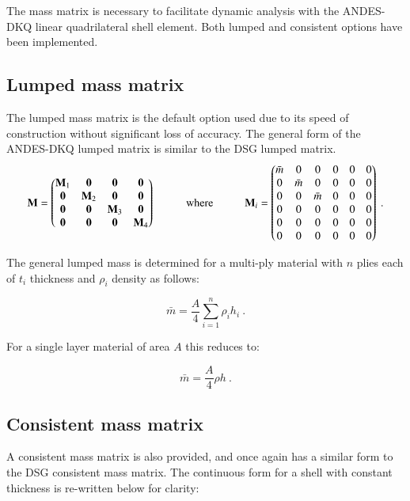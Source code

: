 The mass matrix is necessary to facilitate dynamic analysis with the ANDES-DKQ linear quadrilateral shell element. Both lumped and consistent options have been implemented.

\subsection{Lumped mass matrix}
The lumped mass matrix is the default option used due to its speed of construction without significant loss of accuracy. The general form of the ANDES-DKQ lumped matrix is similar to the DSG lumped matrix.
\begin{equation} 
\mathbf{M} =  
\begin{pmatrix}
\mathbf{M}_1 & \mathbf{0} & \mathbf{0} & \mathbf{0}\\
\mathbf{0} & \mathbf{M}_2 & \mathbf{0} & \mathbf{0}\\
\mathbf{0} & \mathbf{0} & \mathbf{M}_3 & \mathbf{0}\\
\mathbf{0} &\mathbf{0} & \mathbf{0} & \mathbf{M}_4
\end{pmatrix}
\hspace{10mm}
\text{where}
\hspace{10mm}
\mathbf{M}_i =  
\begin{pmatrix}
\bar{m} & 0 & 0 & 0 & 0 & 0\\
0 & \bar{m} & 0 & 0 & 0 & 0\\
0 & 0 & \bar{m} &0 & 0 & 0\\
0 & 0 & 0 & 0 & 0 & 0\\
0 & 0 & 0 & 0 & 0 & 0\\
0 & 0 & 0 & 0 & 0 & 0
\end{pmatrix}
\label{eqqmass1}\ .
\end{equation}

The general lumped mass is determined for a multi-ply material with $n$ plies each of $t_i$ thickness and $\rho_i$ density as follows:

\begin{equation} 
\bar{m} = \frac{A}{4} \sum_{i=1}^n \rho_i h_i
\label{eqqmass2}\ .
\end{equation}

For a single layer material of area $A$ this reduces to:

\begin{equation} 
\bar{m} = \frac{A}{4} \rho h
\label{eqqmass3}\ .
\end{equation}

\subsection{Consistent mass matrix}
A consistent mass matrix is also provided, and once again has a similar form to the DSG consistent mass matrix. The continuous form for a shell with constant thickness is re-written below for clarity:

